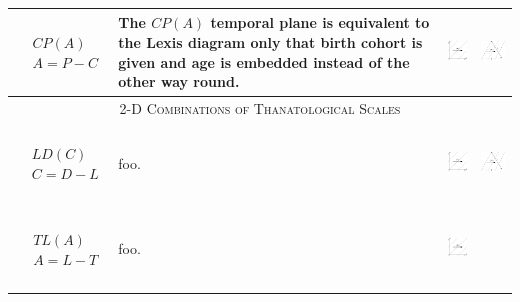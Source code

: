 \documentclass[
  12pt
]{scrartcl}
\begin{document}
\begin{center}
\begin{longtable}{m{}m{}m{}m{}}
  \midrule
  $$\begin{aligned}
    &CP(A) \\
    &A = P - C
  \end{aligned}$$ &
  The $CP(A)$ temporal plane is equivalent to the Lexis diagram only that birth cohort is given and age is embedded instead of the other way round. &
  \includegraphics[height = 2cm]{../fig/CPa.pdf} &
  \includegraphics[height = 2cm]{../fig/CPa_iso.pdf}  \\
  \midrule
  \multicolumn{4}{c}{\textsc{2-D Combinations of Thanatological Scales}} \\
  \midrule
  $$\begin{aligned}
    &LD(C) \\
    &C = D - L
  \end{aligned}$$ &
  foo. &
  \includegraphics[height = 2cm]{../fig/LDc.pdf} &
  \includegraphics[height = 2cm]{../fig/LDc_iso.pdf}  \\
  \midrule
  $$\begin{aligned}
    &TL(A) \\
    &A = L - T
  \end{aligned}$$ &
  foo. &
  \includegraphics[height = 2cm]{../fig/TLa.pdf} &

\end{longtable}
\end{center}
\end{document}
